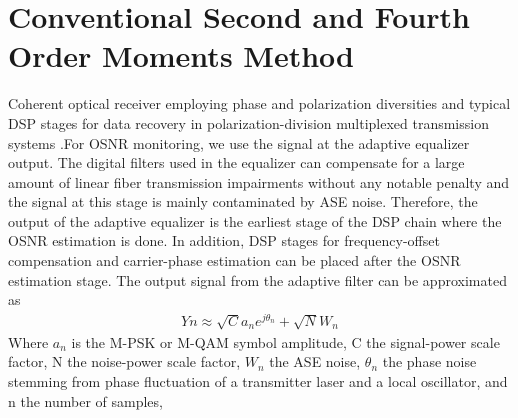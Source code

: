 \documentclass[12pt]{report}
\begin{document}
\section{Conventional Second and Fourth Order Moments Method}
Coherent optical receiver employing phase and polarization diversities and typical DSP stages for data recovery in polarization-division multiplexed transmission systems .For OSNR monitoring, we use the signal at the adaptive equalizer output. The digital filters used in the equalizer can compensate for a large amount of linear fiber transmission impairments without any notable penalty and the signal at this stage is mainly contaminated by ASE noise. Therefore, the output of the adaptive equalizer is the earliest stage of the DSP chain where the OSNR estimation is done. In addition, DSP stages for frequency-offset compensation and carrier-phase estimation can be placed after the OSNR estimation stage. The output signal from the adaptive filter can be approximated as
\begin{align}
Yn \approx \sqrt{C}a_n e^{j\theta_n}+\sqrt{N}W_n
\end{align}
Where $a_n$ is the M-PSK or M-QAM symbol amplitude, C the signal-power scale factor, N the noise-power scale factor, $W_n$ the ASE noise, $\theta_n$ the phase noise stemming from phase fluctuation of a transmitter laser and a local oscillator, and n the number of samples,
\end{document}
